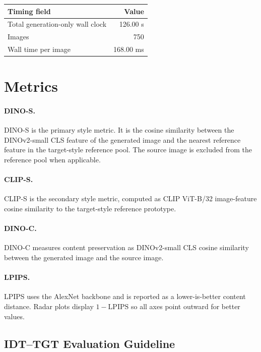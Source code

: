 \documentclass[10pt,twocolumn]{article}
\newcommand{\dinos}{DINO-S}
\newcommand{\dinoc}{DINO-C}
\newcommand{\clips}{CLIP-S}
\begin{document}
\begin{center}
\begin{tabular}{lr}
\toprule
Timing field & Value \\
\midrule
Total generation-only wall clock & 126.00 s \\
Images & 750 \\
Wall time per image & 168.00 ms \\
\bottomrule
\end{tabular}
\end{center}

\section{Metrics}

\paragraph{\dinos.}
\dinos{} is the primary style metric. It is the cosine similarity between the DINOv2-small
CLS feature of the generated image and the nearest reference feature in the target-style
reference pool. The source image is excluded from the reference pool when applicable.

\paragraph{\clips.}
\clips{} is the secondary style metric, computed as CLIP ViT-B/32 image-feature cosine
similarity to the target-style reference prototype.

\paragraph{\dinoc.}
\dinoc{} measures content preservation as DINOv2-small CLS cosine similarity between the
generated image and the source image.

\paragraph{LPIPS.}
LPIPS uses the AlexNet backbone and is reported as a lower-is-better content distance.
Radar plots display \(1-\mathrm{LPIPS}\) so all axes point outward for better values.

\subsection{IDT--TGT Evaluation Guideline}
\end{document}
